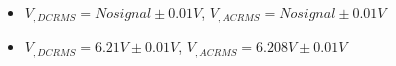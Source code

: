 \begin{itemize}
     \item $V_{, DCRMS}=No signal\pm 0.01\unit{V}$, $V_{, ACRMS}=No signal\pm 0.01\unit{V}$ 
     \item $V_{, DCRMS}=6.21V\pm 0.01\unit{V}$, $V_{, ACRMS}=6.208V\pm 0.01\unit{V}$\\
\end{itemize}